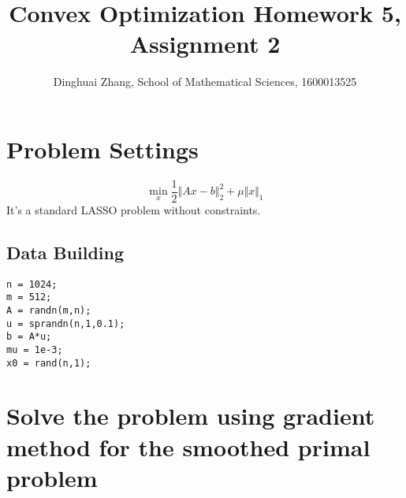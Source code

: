 \documentclass[11pt, oneside]{article}   	%
\title{Convex Optimization Homework 5, Assignment 2}
\author{Dinghuai Zhang, School of Mathematical Sciences, 1600013525}
\date{}							%
\begin{document}
\maketitle
\section{Problem Settings}
\begin{equation}
\min_x \frac{1}{2}\Vert Ax-b\Vert^2_2+\mu\Vert x\Vert_1
\end{equation}
It's a standard LASSO problem without constraints.
\subsection{Data Building}
\lstset{
 frame=single, 
breaklines=true,
language=MATLAB,
 }
\begin{lstlisting}
n = 1024;
m = 512;
A = randn(m,n);
u = sprandn(n,1,0.1);
b = A*u;
mu = 1e-3;
x0 = rand(n,1);
\end{lstlisting}

\section{Solve the problem using gradient method for the smoothed primal problem}
\end{document}
